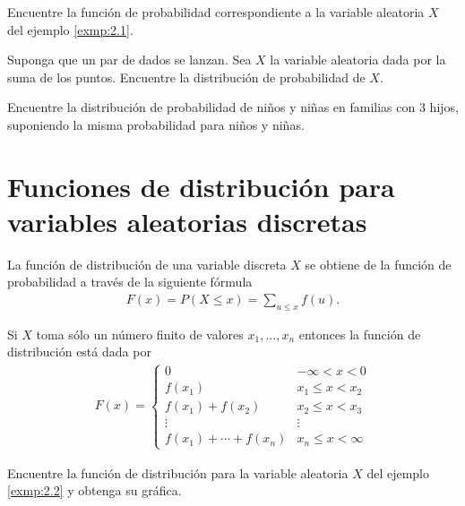 	\begin{ejemplo}
		\label{exmp:2.2}
		Encuentre la función de probabilidad correspondiente a la variable aleatoria $X$ del ejemplo \ref{exmp:2.1}.
	\end{ejemplo}



 \begin{ejemplo}
  \label{sol:2.1}
  Suponga que un par de dados se lanzan. Sea $X$ la variable aleatoria dada por la suma de los puntos. Encuentre la distribución de probabilidad de $X.$
 \end{ejemplo}



 \begin{ejemplo}
  \label{sol:2.2}
  Encuentre la distribución de probabilidad de niños y niñas en familias con 3 hijos, suponiendo la misma probabilidad para niños y niñas.
 \end{ejemplo}



\section{Funciones de distribución para variables aleatorias discretas}


	La función de distribución de una variable discreta $X$ se obtiene de la función de probabilidad a través de la siguiente fórmula
	\begin{align}
		\label{2.4}
		F(x) = P(X\leq x) = \sum_{u \leq x} f(u).
	\end{align}



	Si $X$ toma sólo un número finito de valores $x_{1},...,x_{n}$ entonces la función de distribución está dada por
	\begin{align}
		\label{2.5}
		F(x)=
		\begin{cases}
			0 & -\infty < x < 0 \\
			f(x_{1}) & x_{1} \leq x < x_{2} \\
			f(x_{1})+f(x_{2}) & x_{2} \leq x < x_{3} \\
			\vdots & \vdots \\
			f(x_{1})+\cdots+f(x_{n}) & x_{n} \leq x < \infty
		\end{cases}
	\end{align}



	\begin{ejemplo}
		\label{exmp:2.3}
		Encuentre la función de distribución para la variable aleatoria $X$ del ejemplo \ref{exmp:2.2} y obtenga su gráfica.
	\end{ejemplo}



